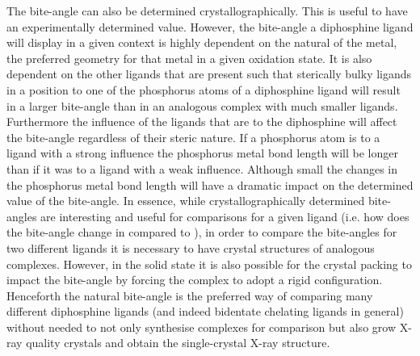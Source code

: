The bite-angle can also be determined crystallographically.  This is useful to have an experimentally determined value.  However, the bite-angle a diphosphine ligand will display in a given context is highly dependent on the natural of the metal, the preferred geometry for that metal in a given oxidation state.  It is also dependent on the other ligands that are present such that sterically bulky ligands in a position \cis{} to one of the phosphorus atoms of a diphosphine ligand will result in a larger bite-angle than in an analogous complex with much smaller ligands.  Furthermore the \trans{} influence of the ligands that are \trans{} to the diphosphine will affect the bite-angle regardless of their steric nature.  If a phosphorus atom is \trans{} to a ligand with a strong \trans{} influence the phosphorus metal bond length will be longer than if it was \trans{} to a ligand with a weak \trans{} influence.  Although small the changes in the phosphorus metal bond length will have a dramatic impact on the determined value of the bite-angle.  In essence, while crystallographically determined bite-angles are interesting and useful for comparisons for a given ligand (i.e. how does the bite-angle change in  compared to ), in order to compare the bite-angles for two different ligands it is necessary to have crystal structures of analogous complexes.  However, in the solid state it is also possible for the crystal packing to impact the bite-angle by forcing the complex to adopt a rigid configuration.  Henceforth the natural bite-angle is the preferred way of comparing many different diphosphine ligands (and indeed bidentate chelating ligands in general) without needed to not only synthesise complexes for comparison but also grow X-ray quality crystals and obtain the single-crystal X-ray structure.

